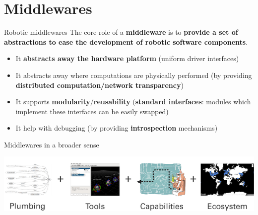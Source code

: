 \documentclass[compress]{beamer}
\newcommand{\source}[2]{{\tiny\it Source: \href{#1}{#2}}}
\begin{document}
%
%
%
%
%
%
%
% 
%
%

\section{Middlewares}

\begin{frame}{Robotic middlewares}
 The core role of a \textbf{middleware} is to \textbf{provide a set of abstractions to ease the development of robotic software components}.

    \begin{itemize}
        \item<+-> It \textbf{abstracts away the hardware platform} (uniform driver interfaces)
        \item<+-> It abstracts away where computations are physically performed (by providing
            \textbf{distributed computation/network transparency})

        \item<+-> It supports \textbf{modularity}/\textbf{reusability} (\textbf{standard interfaces}: modules which
            implement these interfaces can be easily swapped)
        \item<+-> It help with debugging (by providing \textbf{introspection} mechanisms)

    \end{itemize}

\end{frame}

\begin{frame}{Middlewares in a broader sense}
    \begin{center}
        \includegraphics[width=\linewidth]{ros_equation}
    \end{center}
\end{frame}
\end{document}

